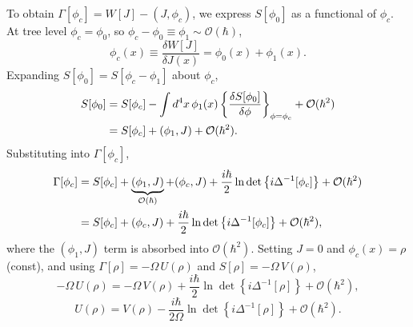 To obtain $\Gamma[\phi_c] = W[J]-(J,\phi_c)$, we express $S[\phi_0]$
as a functional of $\phi_c$. At tree level $\phi_c = \phi_0$, so
$\phi_c - \phi_0 \equiv \phi_1 \sim \mathcal{O}(\hbar)$,
\begin{equation}
	\phi_c(x) \equiv \frac{\delta W[J]}{\delta J(x)}
	= \phi_0(x) + \phi_1(x).
\end{equation}
Expanding $S[\phi_0] = S[\phi_c-\phi_1]$ about $\phi_c$,
\begin{align}
	S[\phi_0] & = S[\phi_c]
	- \int d^4x\,\phi_1(x)
	\left\{\frac{\delta S[\phi_0]}{\delta\phi}\right\}_{\phi=\phi_c}
	+ \mathcal{O}(\hbar^2) \notag                                \\
	          & = S[\phi_c] + (\phi_1,J) + \mathcal{O}(\hbar^2).
\end{align}
Substituting into $\Gamma[\phi_c]$,
\begin{align}
	\Gamma[\phi_c]
	 & = S[\phi_c] + \underbrace{(\phi_1,J)}_{\mathcal{O}(\hbar)}
	+ (\phi_c,J)
	+ \frac{i\hbar}{2}\ln\det\left\{i\Delta^{-1}[\phi_c]\right\}
	+ \mathcal{O}(\hbar^2) \notag                                 \\
	 & = S[\phi_c] + (\phi_c,J)
	+ \frac{i\hbar}{2}\ln\det\left\{i\Delta^{-1}[\phi_c]\right\}
	+ \mathcal{O}(\hbar^2),
\end{align}
where the $(\phi_1,J)$ term is absorbed into $\mathcal{O}(\hbar^2)$.
Setting $J=0$ and $\phi_c(x)=\rho$ (const), and using
$\Gamma[\rho]=-\Omega\,U(\rho)$ and $S[\rho]=-\Omega\,V(\rho)$,
\begin{equation}
	-\Omega\,U(\rho) = -\Omega\,V(\rho)
	+ \frac{i\hbar}{2}\ln\det\left\{i\Delta^{-1}[\rho]\right\}
	+ \mathcal{O}(\hbar^2),
\end{equation}
\begin{equation}
	\boxed{U(\rho) = V(\rho)
		- \frac{i\hbar}{2\Omega}\ln\det\left\{i\Delta^{-1}[\rho]\right\}
		+ \mathcal{O}(\hbar^2).}
	\label{eq:U_rho}
\end{equation}

